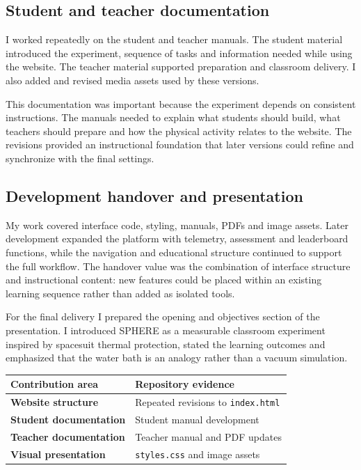 \documentclass[9pt,a4paper]{extarticle}
\begin{document}
\subsection*{Student and teacher documentation}
I worked repeatedly on the student and teacher manuals. The student material introduced the experiment, sequence of tasks and information needed while using the website. The teacher material supported preparation and classroom delivery. I also added and revised media assets used by these versions.

This documentation was important because the experiment depends on consistent instructions. The manuals needed to explain what students should build, what teachers should prepare and how the physical activity relates to the website. The revisions provided an instructional foundation that later versions could refine and synchronize with the final settings.

\subsection*{Development handover and presentation}
My work covered interface code, styling, manuals, PDFs and image assets. Later development expanded the platform with telemetry, assessment and leaderboard functions, while the navigation and educational structure continued to support the full workflow. The handover value was the combination of interface structure and instructional content: new features could be placed within an existing learning sequence rather than added as isolated tools.

For the final delivery I prepared the opening and objectives section of the presentation. I introduced SPHERE as a measurable classroom experiment inspired by spacesuit thermal protection, stated the learning outcomes and emphasized that the water bath is an analogy rather than a vacuum simulation.

\begin{center}\small
\begin{tabularx}{0.86\textwidth}{@{}>{\bfseries}p{}X@{}}
\toprule
Contribution area & Repository evidence \\
\midrule
Website structure & Repeated revisions to \texttt{index.html} \\
Student documentation & Student manual development \\
Teacher documentation & Teacher manual and PDF updates \\
Visual presentation & \texttt{styles.css} and image assets \\
\bottomrule
\end{tabularx}
\end{center}
\end{document}
